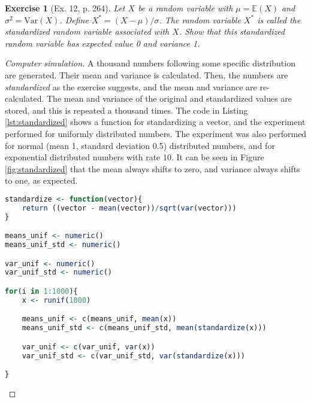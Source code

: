 \documentclass[letterpaper, 10 pt, conference]{article}
\newtheorem{ex}{Exercise}
\newcommand\E{\ensuremath{\mathbb{E}}}
\newcommand\V{\ensuremath{\mathrm{Var}}}
\begin{document}
\begin{ex}[Ex. 12, p. 264]\label{ex:standardized}
	Let $X$ be a random variable with $\mu = \E(X)$ and $\sigma^2 = \V(X)$. Define $X^\ast = (X-\mu)/\sigma$. The random variable $X^\ast$ is called the \textit{standardized random variable} associated with $X$. Show that this standardized random variable has expected value 0 and variance 1.
\end{ex}
\begin{proof}[Computer simulation]
	A thousand numbers following some specific distribution are generated. Their mean and variance is calculated. Then, the numbers are \textit{standardized} as the exercise suggests, and the mean and variance are re-calculated. The mean and variance of the original and standardized values are stored, and this is repeated a thousand times. The code in Listing \ref{lst:standardized} shows a function for standardizing a vector, and the experiment performed for uniformly distributed numbers. The experiment was also performed for normal (mean 1, standard deviation 0.5) distributed numbers, and for exponential distributed numbers with rate 10.  It can be seen in Figure \ref{fig:standardized} that the mean always shifts to zero, and variance always shifts to one, as expected.
	
	\begin{lstlisting}[language=R, caption={Code for Exercise \ref{ex:standardized}.}, label={lst:standardized} ]
standardize <- function(vector){
	return ((vector - mean(vector))/sqrt(var(vector)))
}

means_unif <- numeric()
means_unif_std <- numeric()

var_unif <- numeric()
var_unif_std <- numeric()

for(i in 1:1000){
	x <- runif(1000)

	means_unif <- c(means_unif, mean(x))
	means_unif_std <- c(means_unif_std, mean(standardize(x)))

	var_unif <- c(var_unif, var(x))
	var_unif_std <- c(var_unif_std, var(standardize(x))) 

}
	\end{lstlisting}
	

\end{proof}
\end{document}
